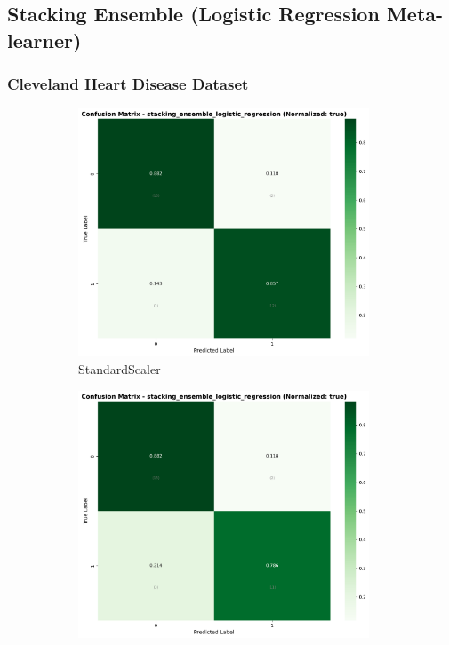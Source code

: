 \FloatBarrier

\subsection{Stacking Ensemble (Logistic Regression Meta-learner)}\label{subsec:stacking}

\subsubsection{Cleveland Heart Disease Dataset}\label{subsubsec:stacking-cleveland}

\begin{figure}[H]\centering
\begin{subfigure}[b]{0.31\textwidth}\centering
\includegraphics[width=0.95\textwidth]{Result/cleveland_dataset/confusion_matrices/stacking_ensemble_logistic_regression_numeric_dataset_StandardScaler.png}
\caption{StandardScaler}\label{fig:stacking_clev_cm_standard}
\end{subfigure}\hfill
\begin{subfigure}[b]{0.31\textwidth}\centering
\includegraphics[width=0.95\textwidth]{Result/cleveland_dataset/confusion_matrices/stacking_ensemble_logistic_regression_numeric_dataset_MinMaxScaler.png}

\end{subfigure}
\end{figure}
